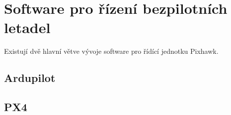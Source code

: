 \chapter{Software pro řízení bezpilotních letadel}

Existují dvě hlavní větve vývoje software pro řídící jednotku Pixhawk. 


\section{Ardupilot}



\section{PX4}